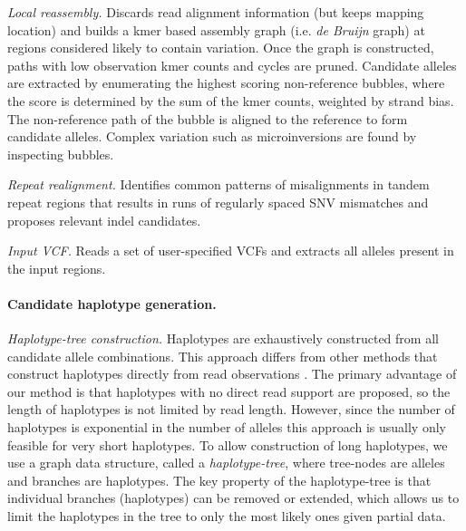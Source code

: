 \documentclass[notitlepage, twocolumn, 10pt]{article}
\begin{document}
\vspace{3mm}
\noindent\emph{Local reassembly.} Discards read alignment information (but keeps mapping location) and builds a kmer based assembly graph (i.e. \emph{de Bruijn} graph) at regions considered likely to contain variation. Once the graph is constructed, paths with low observation kmer counts and cycles are pruned. Candidate alleles are extracted by enumerating the highest scoring non-reference bubbles, where the score is determined by the sum of the kmer counts, weighted by strand bias. The non-reference path of the bubble is aligned to the reference to form candidate alleles. Complex variation such as microinversions are found by inspecting bubbles.

\vspace{3mm}
\noindent\emph{Repeat realignment.} Identifies common patterns of misalignments in tandem repeat regions that results in runs of regularly spaced SNV mismatches and proposes relevant indel candidates.

\vspace{3mm}
\noindent\emph{Input VCF.} Reads a set of user-specified VCFs and extracts all alleles present in the input regions.

\paragraph*{Candidate haplotype generation.} \emph{Haplotype-tree construction.} Haplotypes are exhaustively constructed from all candidate allele combinations. This approach differs from other methods that construct haplotypes directly from read observations \cite{RN141, RN538}. The primary advantage of our method is that haplotypes with no direct read support are proposed, so the length of haplotypes is not limited by read length. However, since the number of haplotypes is exponential in the number of alleles this approach is usually only feasible for very short haplotypes. To allow construction of long haplotypes, we use a graph data structure, called a \emph{haplotype-tree}, where tree-nodes are alleles and branches are haplotypes. The key property of the haplotype-tree is that individual branches (haplotypes) can be removed or extended, which allows us to limit the haplotypes in the tree to only the most likely ones given partial data.
\end{document}
